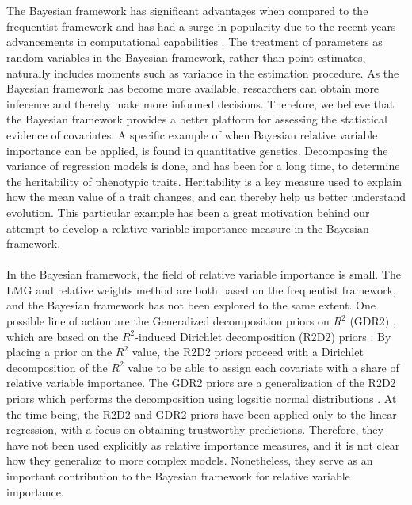 \\
\\
The Bayesian framework has significant advantages when compared to the frequentist framework \citep{robert2007bayesian} and has had a surge in popularity due to the recent years advancements in computational capabilities \citep{hackenberger2019bayes}. The treatment of parameters as random variables in the Bayesian framework, rather than point estimates, naturally includes moments such as variance in the estimation procedure. As the Bayesian framework has become more available, researchers can obtain more inference and thereby make more informed decisions. Therefore, we believe that the Bayesian framework provides a better platform for assessing the statistical evidence of covariates. A specific example of when Bayesian relative variable importance can be applied, is found in quantitative genetics. Decomposing the variance of regression models is done, and has been for a long time, to determine the heritability of phenotypic traits. Heritability is a key measure used to explain how the mean value of a trait changes, and can thereby help us better understand evolution. This particular example has been a great motivation behind our attempt to develop a relative variable importance measure in the Bayesian framework.
\\
\\
In the Bayesian framework, the field of relative variable importance is small. The LMG and relative weights method are both based on the frequentist framework, and the Bayesian framework has not been explored to the same extent. One possible line of action are the Generalized decomposition priors on $R^2$ (GDR2) \citep{aguilar2024generalized}, which are based on the $R^2$-induced Dirichlet decomposition (R2D2) priors \citep{zhang2020bayesian}. By placing a prior on the $R^2$ value, the R2D2 priors proceed with a Dirichlet decomposition of the $R^2$ value to be able to assign each covariate with a share of relative variable importance. The GDR2 priors are a generalization of the R2D2 priors which performs the decomposition using logsitic normal distributions \citep{aguilar2024generalized}. At the time being, the R2D2 and GDR2 priors have been applied only to the linear regression, with a focus on obtaining trustworthy predictions. Therefore, they have not been used explicitly as relative importance measures, and it is not clear how they generalize to more complex models. Nonetheless, they serve as an important contribution to the Bayesian framework for relative variable importance.
